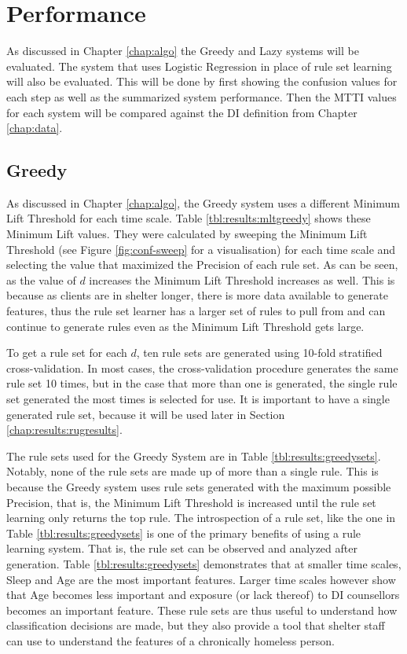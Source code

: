 \section{\Abb Performance} \label{chap:results:rapid}
As discussed in Chapter \ref{chap:algo} the Greedy and Lazy systems will be evaluated. The system that uses Logistic Regression in place of rule set learning will also be evaluated. This will be done by first showing the confusion values for each step as well as the summarized system performance. Then the MTTI values for each system will be compared against the DI definition from Chapter \ref{chap:data}.


\subsection{Greedy}
As discussed in Chapter \ref{chap:algo}, the Greedy system uses a different Minimum Lift Threshold for each time scale. Table \ref{tbl:results:mltgreedy} shows these Minimum Lift values. They were calculated by sweeping the Minimum Lift Threshold (see Figure \ref{fig:conf-sweep} for a visualisation) for each time scale and selecting the value that maximized the Precision of each rule set. As can be seen, as the value of $d$ increases the Minimum Lift Threshold increases as well. This is because as clients are in shelter longer, there is more data available to generate features, thus the rule set learner has a larger set of rules to pull from and can continue to generate rules even as the Minimum Lift Threshold gets large.

To get a rule set for each $d$, ten rule sets are generated using 10-fold stratified cross-validation. In most cases, the cross-validation procedure generates the same rule set 10 times, but in the case that more than one is generated, the single rule set generated the most times is selected for use. It is important to have a single generated rule set, because it will be used later in Section \ref{chap:results:rugresults}.

The rule sets used for the Greedy System are in Table \ref{tbl:results:greedysets}. Notably, none of the rule sets are made up of more than a single rule. This is because the Greedy system uses rule sets generated with the maximum possible Precision, that is, the Minimum Lift Threshold is increased until the rule set learning only returns the top rule. The introspection of a rule set, like the one in Table \ref{tbl:results:greedysets} is one of the primary benefits of using a rule learning system. That is, the rule set can be observed and analyzed after generation.
Table \ref{tbl:results:greedysets} demonstrates that at smaller time scales, Sleep and Age are the most important features. Larger time scales however show that Age becomes less important and exposure (or lack thereof) to DI counsellors becomes an important feature. These rule sets are thus useful to understand how classification decisions are made, but they also provide a tool that shelter staff can use to understand the features of a chronically homeless person.

